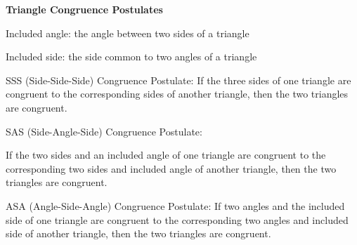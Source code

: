 \begin{center}
\textbf{Triangle Congruence Postulates 
}
\end{center}

\vspce

Included angle: the angle between two sides of a triangle 

\vspce 

Included side: the side common to  two angles  of a triangle 


\vspce 

SSS (Side-Side-Side) Congruence Postulate: If the three sides of one triangle are congruent to the corresponding sides of another triangle, then the two triangles are congruent.

\vspce 

SAS (Side-Angle-Side) Congruence Postulate: 

If the two sides and an included angle of one triangle are congruent to the corresponding  two sides and included angle of another triangle, then the two triangles are congruent.

\vspce 

ASA (Angle-Side-Angle) Congruence Postulate: If two angles and the included side of one triangle are congruent to the corresponding two angles and included side of another triangle, then the two triangles are congruent. 




